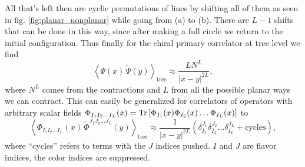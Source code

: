 All that's left then are cyclic permutations of lines by shifting all of them as seen in fig. \ref{fig:planar_nonplanar} while going from (a) to (b). There are $L-1$ shifts that can be done in this way, since after making a full circle we return to the initial configuration. Thus finally for the chiral primary correlator at tree level we find
\begin{equation}
	\left< \Psi(x) \, \tilde{\Psi}(y) \right>_{\mathrm{tree}} \approx \frac{L N^L}{|x-y|^{2L}},
\end{equation}
where $N^L$ comes from the contractions and $L$ from all the possible planar ways we can contract. This can easily be generalized for correlators of operators with arbitrary scalar fields $\Phi_{I_1 I_2 \dots I_L}(x) = \mathrm{Tr} \left[ \Phi_{I_1}(x) \Phi_{I_2}(x) \dots \Phi_{I_L}(x) \right]$ to
\begin{equation}
	\left< \Phi_{I_1 I_2 \dots I_L}(x) \, \tilde{\Phi}^{J_1 J_2 \dots J_L}(y)  \right>_{\mathrm{tree}} \approx \frac{1}{|x-y|^{2L}} \left( \delta_{I_1}^{J_1} \delta_{I_2}^{J_2} \dots \delta_{I_L}^{J_L} + \mathrm{cycles} \right),
	\label{eq:tree_correlator}
\end{equation}
where ``cycles'' refers to terms with the $J$ indices pushed. $I$ and $J$ are flavor indices, the color indices are suppressed.
 
